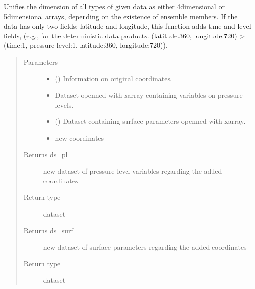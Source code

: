 \documentclass[a4paper,11pt,english]{sphinxmanual}
\begin{document}
\begin{fulllineitems}
\label{\detokenize{modules:envlib.extend_dim.extend_dimensions}}
Unifies the dimension of all types of given data as either 4\sphinxhyphen{}dimensional or 5\sphinxhyphen{}dimensional arrays, depending on
the existence of ensemble members. If the data has only two fields: latitude and longitude, this function
adds time and level fields, (e.g., for the deterministic data products: (latitude:360, longitude:720) \sphinxhyphen{}\textgreater{} (time:1, pressure level:1, latitude:360, longitude:720)).
\begin{quote}\begin{description}
\item[{Parameters}] \leavevmode\begin{itemize}
\item {} 
 () \textendash{} Information on original coordinates.

\item {} 
 \textendash{} Dataset openned with xarray containing variables on pressure levels.

\item {} 
 () \textendash{} Dataset containing surface parameters openned with xarray.

\item {} 
 \textendash{} new coordinates

\end{itemize}

\item[{Returns ds\_pl}] \leavevmode
new dataset of pressure level variables regarding the added coordinates

\item[{Return type}] \leavevmode
dataset

\item[{Returns ds\_surf}] \leavevmode
new dataset of surface parameters regarding the added coordinates

\item[{Return type}] \leavevmode
dataset

\end{description}\end{quote}

\end{fulllineitems}
\end{document}
